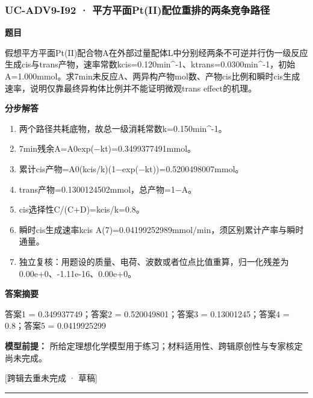 \documentclass[UTF8,11pt,a4paper]{ctexart}
\begin{document}
\subsubsection*{UC-ADV9-I92 · 平方平面Pt(II)配位重排的两条竞争路径}
\noindent\textbf{题目}\par
假想平方平面Pt(II)配合物A在外部过量配体L中分别经两条不可逆并行伪一级反应生成cis与trans产物，速率常数kcis=0.120min\textasciicircum{}-1、ktrans=0.0300min\textasciicircum{}-1，初始A=1.000mmol。求7min未反应A、两异构产物mol数、产物cis比例和瞬时cis生成速率，说明仅靠最终异构体比例并不能证明微观trans effect的机理。\par
\medskip\noindent\textbf{分步解答}
\begin{enumerate}
\item 两个路径共耗底物，故总一级消耗常数k=0.150min\textasciicircum{}-1。
\item 7min残余A=A0exp(−kt)=0.3499377491mmol。
\item 累计cis产物=A0(kcis/k)(1−exp(−kt))=0.5200498007mmol。
\item trans产物=0.1300124502mmol，总产物=1−A。
\item cis选择性C/(C+D)=kcis/k=0.8。
\item 瞬时cis生成速率kcis A(7)=0.04199252989mmol/min，须区别累计产率与瞬时通量。
\item 独立复核：用题设的质量、电荷、波数或者位点比值重算，归一化残差为0.00e+0、-1.11e-16、0.00e+0。
\end{enumerate}
\noindent\textbf{答案摘要}\par
答案1 = 0.349937749；答案2 = 0.520049801；答案3 = 0.13001245；答案4 = 0.8；答案5 = 0.0419925299\par
\noindent\textbf{模型前提：}
所给定理想化学模型用于练习；材料适用性、跨辑原创性与专家核定尚未完成。\par
\noindent\textcolor{red!65!black}{[跨辑去重未完成 · 草稿]} \par
\medskip\hrule\medskip
{}
\end{document}

